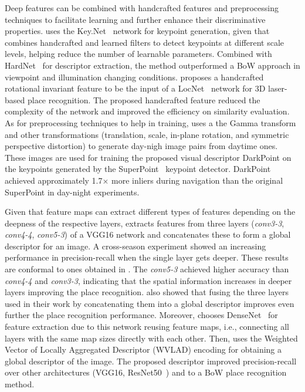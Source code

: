 Deep features can be combined with handcrafted features and preprocessing techniques to facilitate learning and further enhance their discriminative properties.
\cite{zhang-et-al:2022:3086822} uses the Key.Net~\parencite{original:keynet} network for keypoint generation, given that combines handcrafted and learned filters to detect keypoints at different scale levels, helping reduce the number of learnable parameters. Combined with HardNet~\parencite{original:hardnet} for descriptor extraction, the method outperformed a BoW approach in viewpoint and illumination changing conditions.
\cite{yin-et-al:2020:2905046} proposes a handcrafted rotational invariant feature to be the input of a LocNet~\parencite{original:locnet} network for 3D laser-based place recognition. The proposed handcrafted feature reduced the complexity of the network and improved the efficiency on similarity evaluation.
As for preprocessing techniques to help in training, \cite{sun-et-al:2021:9635886} uses a the Gamma transform and other transformations (translation, scale, in-plane rotation, and symmetric perspective distortion) to generate day-nigh image pairs from daytime ones. These images are used for training the proposed visual descriptor DarkPoint on the keypoints generated by the SuperPoint~\parencite{original:superpoint} keypoint detector. DarkPoint achieved approximately 1.7$\times$ more inliers during navigation than the original SuperPoint in day-night experiments.

Given that feature maps can extract different types of features depending on the deepness of the respective layers, \cite{zhu-et-al:2018:8500686} extracts features from three layers (\textit{conv3-3}, \textit{conv4-4}, \textit{conv5-3}) of a VGG16 network and concatenates these to form a global descriptor for an image. A cross-season experiment showed an increasing performance in precision-recall when the single layer gets deeper.
These results are conformal to ones obtained in \cite{yang-et-al:2021:12054}. The \textit{conv5-3} achieved higher accuracy than \textit{conv4-4} and \textit{conv3-3}, indicating that the spatial information increases in deeper layers improving the place recognition. \cite{zhu-et-al:2018:8500686} also showed that fusing the three layers used in their work by concatenating them into a global descriptor improves even further the place recognition performance.
Moreover, \cite{yu-et-al:2019:8961714} chooses DenseNet~\parencite{original:densenet} for feature extraction due to this network reusing feature maps, i.e., connecting all layers with the same map sizes directly with each other. Then, \cite{yu-et-al:2019:8961714} uses the Weighted Vector of Locally Aggregated Descriptor (WVLAD) encoding for obtaining a global descriptor of the image. The proposed descriptor improved precision-recall over other architectures (VGG16, ResNet50~\parencite{original:resnet}) and to a BoW place recognition method.

